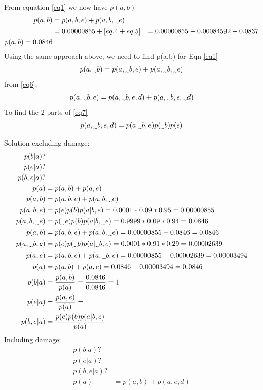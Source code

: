 \documentclass{article}
\newcommand{\midtilde}{\raisebox{-0.25\baselineskip}{\textasciitilde}}
\begin{document}
From equation \ref{eq1} we now have $p(a,b)$
\begin{align*}
    p(a,b) & = p(a,b,e) + p(a,b,\midtilde e) \\
    & = 0.00000855 + [ eq. 4 + eq. 5 ]
    & = 0.00000855 + 0.00084592 + 0.0837 \\
    p(a,b) = 0.0846
\end{align*}
Using the same approach above, we need to find p(a,\midtilde b) for Eqn \ref{eq1}
\begin{equation}
    p(a,\midtilde b) = p (a,\midtilde b, e) + p(a, \midtilde b, \midtilde e) \label{eq6}
\end{equation}
from \ref{eq6},
\begin{equation}
    p(a, \midtilde b, e) = p(a,\midtilde b, e, d) + p(a,\midtilde b, e, \midtilde d) \label{eq7}
\end{equation}
To find the 2 parts of \ref{eq7}
\begin{align*}
    p(a,\midtilde b, e, d) = p(a|\midtilde b, e) p(\midtilde b) p(e)
\end{align*}



Solution excluding damage:
\begin{align*}
p(b|a) ? & \\
p(e|a) ? & \\
p(b,e|a) ? & \\
p(a) & = p(a,b) + p(a,e) \\
p(a,b) & = p(a,b,e) + p(a,b,\midtilde e) \\
p(a,b,e) & = p(e)p(b)p(a|b,e) = 0.0001*0.09*0.95 = 0.00000855 \\
p(a,b,\midtilde e) & = p(\midtilde e)p(b)p(a|b,\midtilde e) = 0.9999*0.09*0.94 = 0.0846\\
p(a,b) & = p(a,b,e) + p(a,b,\midtilde e) = 0.00000855 + 0.0846 = 0.0846 \\
p(a,\midtilde b,e) & = p(e)p(\midtilde b)p(a|\midtilde b,e) = 0.0001*0.91*0.29 = 0.00002639 \\
p(a,e) & = p(a,b,e) + p(a,\midtilde b,e) = 0.00000855 + 0.00002639 = 0.00003494 \\
p(a) & = p(a,b) + p(a,e) =  0.0846 + 0.00003494 =  0.0846\\
p(b|a) & = \frac{p(a,b)}{p(a)} = \frac{0.0846}{0.0846} = 1\\
p(e|a) & = \frac{p(a,e)}{p(a)} = \\
p(b,e|a) & = \frac{p(e)p(b)p(a|b,e)}{p(a)} \\
\end{align*}
Including damage:
\begin{align*}
p(b|a) ? & \\
p(e|a) ? & \\
p(b,e|a) ? & \\
p(a) & = p(a,b) + p(a,e,d) \\
\end{align*}
\end{document}
